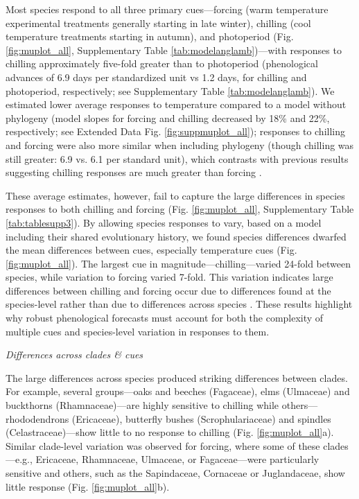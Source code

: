 \documentclass{article}
\begin{document}


Most species respond to all three primary cues---forcing (warm temperature experimental treatments generally starting in late winter), chilling (cool temperature treatments starting in autumn), and photoperiod (Fig. \ref{fig:muplot_all}, Supplementary Table \ref{tab:modelanglamb})---with responses to chilling approximately five-fold greater than to photoperiod (phenological advances of 6.9 days per standardized unit vs 1.2 days, for chilling and photoperiod, respectively; see Supplementary Table \ref{tab:modelanglamb}). We estimated lower average responses to temperature compared to a model without phylogeny (model slopes for forcing and chilling decreased by 18\% and 22\%, respectively; see Extended Data Fig. \ref{fig:suppmuplot_all}); responses to chilling and forcing were also more similar when including phylogeny (though chilling was still greater: 6.9 vs. 6.1 per standard unit), which contrasts with previous results suggesting chilling responses are much greater than forcing  \citep{Laube:2014a,ettinger2020}. 

These average estimates, however, fail to capture the large differences in species responses to both chilling and forcing (Fig. \ref{fig:muplot_all}, Supplementary Table \ref{tab:tablesupp3}). By allowing species responses to vary, based on a model including their shared evolutionary history, we found species differences dwarfed the mean differences between cues, especially temperature cues (Fig. \ref{fig:muplot_all}). The largest cue in magnitude---chilling---varied 24-fold between species, while variation to forcing varied 7-fold. This variation indicates large differences between chilling and forcing occur due to differences found at the species-level rather than due to differences across species \citep[e.g., the average effect across species as previously suggested,][]{Laube:2014a,ettinger2020}. These results highlight why robust phenological forecasts must account for both the complexity of multiple cues and species-level variation in responses to them.

\emph{Differences across clades \& cues}

The large differences across species produced striking differences between clades. For example, several groups---oaks and
beeches (Fagaceae), elms (Ulmaceae) and buckthorns (Rhamnaceae)---are highly sensitive to chilling while others---rhododendrons (Ericaceae), butterfly bushes (Scrophulariaceae) and spindles (Celastraceae)---show little to no response to chilling  (Fig. \ref{fig:muplot_all}a). %
Similar clade-level variation was observed for forcing, where some of these clades---e.g., Ericaceae, Rhamnaceae, Ulmaceae, or Fagaceae---were particularly sensitive and others, such as the Sapindaceae, Cornaceae or Juglandaceae, show little response (Fig. \ref{fig:muplot_all}b). 
\end{document}
